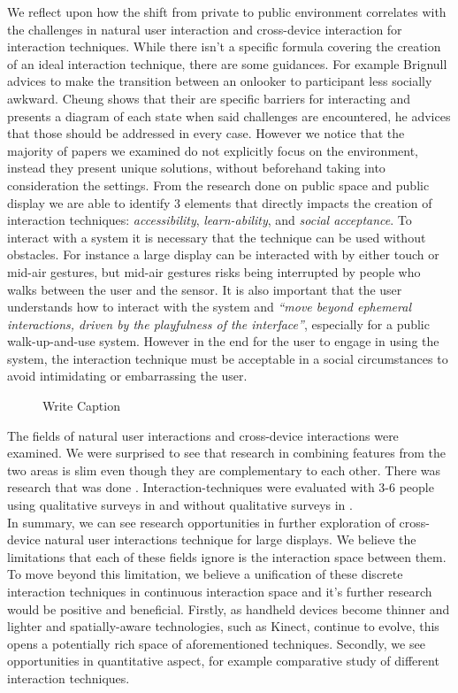 We reflect upon how the shift from private to public environment correlates with the challenges in natural user interaction and cross-device interaction for interaction techniques.
While there isn't a specific formula covering the creation of an ideal interaction technique, there are some guidances. For example Brignull advices to make the transition between an onlooker to participant less socially awkward. Cheung shows that their are specific barriers for interacting and presents a diagram of each state when said challenges are encountered, he advices that those should be addressed in every case. However we notice that the majority of papers we examined do not explicitly focus on the environment, instead they present unique solutions, without beforehand taking into consideration the settings.
From the research done on public space and public display we are able to identify 3 elements that directly impacts the creation of interaction techniques: \emph{accessibility}, \emph{learn-ability}, and \emph{social acceptance}. To interact with a system it is necessary that the technique can be used without obstacles. For instance a large display can be interacted with by either touch or mid-air gestures, but mid-air gestures risks being interrupted by people who walks between the user and the sensor. It is also important that the user understands how to interact with the system and \emph{``move beyond ephemeral interactions, driven by the playfulness of the interface''}\cite{Jacucci:2010}, especially for a public walk-up-and-use system. However in the end for the user to engage in using the system, the interaction technique must be acceptable in a social circumstances to avoid intimidating or embarrassing the user. 

\begin{figure}[h!]
\centering
{}
\caption{Write Caption}
\label{fig:litreview}
\end{figure}

The fields of natural user interactions and cross-device interactions were examined. 
We were surprised to see that research in combining features from the two areas is slim even though they are complementary to each other. 
There was research that was done \cite{Scharf:2013,Seifert:2012,Valkanova:2014,Vogel:2005} . 
Interaction-techniques were evaluated with 3-6 people using qualitative surveys in \cite{Seifert:2012,Valkanova:2014,Vogel:2005} and without qualitative surveys in \cite{Schmidt:2012}.\\

In summary, we can see research opportunities in further exploration of cross-device natural user interactions technique for large displays. We believe the limitations that each of these fields ignore is the interaction space between them. To move beyond this limitation, we believe a unification of these discrete interaction techniques in continuous interaction space and it's further research would be positive and beneficial.
Firstly, as handheld devices become thinner and lighter and spatially-aware technologies, such as Kinect, continue to evolve, this opens a potentially rich space of aforementioned techniques. 
Secondly, we see opportunities in quantitative aspect, for example comparative study of different interaction techniques. 
